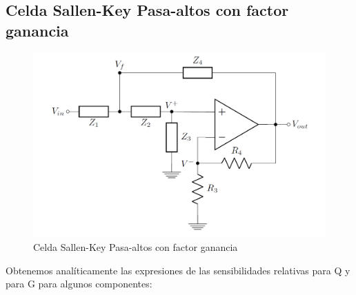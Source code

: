 \documentclass[../tc_tpfinal_main.tex]{subfiles}
\begin{document}
\subsection{Celda Sallen-Key Pasa-altos con factor ganancia}
\begin{figure}[H]	
	\centering
	\includegraphics[scale=0.5]{imagenes/sallen_key_gain_circ.png}
	\caption{Celda Sallen-Key Pasa-altos con factor ganancia}
	\label{fig:tpfinal_sallen_key_gain_circ}
\end{figure}

Obtenemos analíticamente las expresiones de las sensibilidades relativas para Q y para G para algunos componentes: \par
\end{document}
